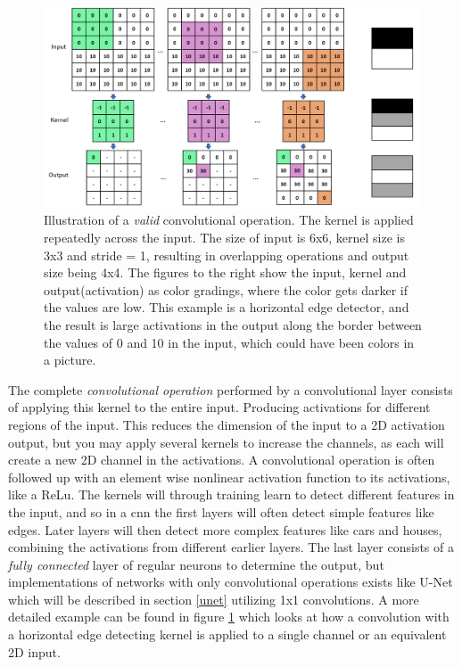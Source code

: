     \begin{figure}[H]
        \centering
        \includegraphics[scale=0.4]{figures/convolutions.png}
        \caption[Horizontal edge detector example]{Illustration of a \textit{valid} convolutional operation. The kernel is applied repeatedly across the input. The size of input is 6x6, kernel size is 3x3 and stride = 1, resulting in overlapping operations and output size being 4x4. The figures to the right show the input, kernel and output(activation) as color gradings, where the color gets darker if the values are low. This example is a horizontal edge detector, and the result is large activations in the output along the border between the values of 0 and 10 in the input, which could have been colors in a picture.}
      	\medskip 
        \label{convolutional_fig}
    \end{figure}

    The complete \textit{convolutional operation} performed by a convolutional layer consists of applying this kernel to the entire input. Producing activations for different regions of the input. This reduces the dimension of the input to a 2D activation output, but you may apply several kernels to increase the channels, as each will create a new 2D channel in the activations. A convolutional operation is often followed up with an element wise nonlinear activation function to its activations, like a ReLu. The kernels will through training learn to detect different features in the input, and so in a \gls{cnn} the first layers will often detect simple features like edges. Later layers will then detect more complex features like cars and houses, combining the activations from different earlier layers. The last layer consists of a \textit{fully connected} layer of regular neurons to determine the output, but implementations of networks with only convolutional operations exists like U-Net which will be described\cite{unet_ronneberger2015} in section \ref{unet} utilizing 1x1 convolutions. A more detailed example can be found in figure \ref{convolutional_fig} which looks at how a convolution with a horizontal edge detecting kernel is applied to a single channel or an equivalent 2D input. 
    
